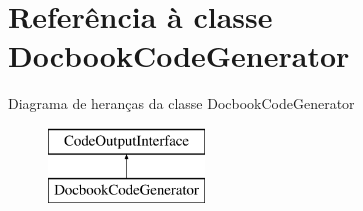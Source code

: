 \hypertarget{class_docbook_code_generator}{\section{Referência à classe Docbook\-Code\-Generator}
\label{class_docbook_code_generator}
}
Diagrama de heranças da classe Docbook\-Code\-Generator\begin{figure}[H]
\begin{center}
\leavevmode
\includegraphics[height=2.000000cm]{class_docbook_code_generator}
\end{center}
\end{figure}
